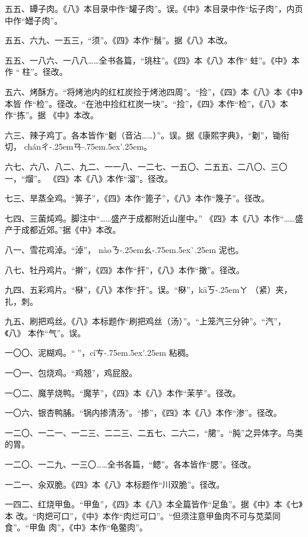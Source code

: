 \begin{list}{}
五五、罈子肉。《八》本目录中作“罐子肉”。误。《中》本目录中作“坛子肉”，内页
中作“罎子肉”。

五五、六九、一五三，“须”。《四》本作“鬚”。据《八》本改。

五五、一八六、一八八……全书各篇，“珧柱”。《四》本《八》本作“𧎼蛀”。《中》本作
“𧎼柱”。径改。

五六、烤酥方。“将烤池内的红杠炭捡于烤池四周”。“捡”，《四》本《八》本《中》本皆
作“检”。径改。“在池中捡红杠炭一块”。“捡”，《四》本作“检”，《八》本作“拣”。据
《中》本改。

六三、辣子鸡丁。各本皆作“劖（音沾……）”。误。据《康熙字典》，“劖”，锄衔切，
{ch\'{a}n}{ㄔ\kern-.25emㄢ\kern-.75em\raise.5ex\hbox{\'{}}\kern.25em}。

六七、六八、八二、九二、一一八、一二七、一五〇、二五五、二八〇、三〇一，“熘”。
《四》本《八》本作“溜”。径改。

七三、旱蒸全鸡。“箅子”，《四》本作“篦子”，《八》本作“篾子”。径改。

七四、三菌炖鸡。脚注{\footnotesize{}}中“……盛产于成都附近山崖中。”
《四》本《八》本作“……盛产于成都近郊。”据《中》本改。

八一、雪花鸡淖。“淖”，
{n\`{a}o}{ㄋ\kern-.25emㄠ\kern-.75em\raise.5ex\hbox{\`{}}\kern.25em} 泥也。

八七、牡丹鸡片。“擀”，《四》本作“扞”，《八》本作“撖”。径改。

九四、五彩鸡片。“㮟”，《八》本作“扞”。误。“㮟”，{k\={a}}{ㄎ\kern-.25emㄚ}
（紧）夹，扎，刺。

九五、刷把鸡丝。《八》本标题作“刷把鸡丝（汤）”。“上笼汽三分钟”。“汽”，《八》
本作“气”。误。

一〇〇、泥糊鸡。“𫃕”，{c\'{i}}{ㄘ\kern-.75em\raise.5ex\hbox{\'{}}\kern.25em}
粘稠。

一〇一、包烧鸡。“鸡翘”，鸡屁股。

一〇二、魔芋烧鸭。“魔芋”，《四》本《八》本作“茉芋”。径改。

一〇六、银杏鸭脯。“锅内掺清汤”。“掺”，《四》本《八》本作“渗”。径改。

一二〇、一二一、一二三、二二三、二五七、二六二，“𬂁”。“肫”之异体字。鸟类的胃。

一二〇、一二九、一三〇……全书各篇，“鳃”。各本皆作“腮”。径改。

一二一、汆双脆。《四》本《八》本标题作“川双脆”。径改。

一四二、红烧甲鱼。“甲鱼”，《四》本《八》本全篇皆作“足鱼”。据《中》本《七》本
改。“肉𤆵可口”，《中》本作“肉烂可口”。“但须注意甲鱼肉不可与苋菜同食”。“甲鱼
肉”，《中》本作“龟鳖肉”。


\end{list}
